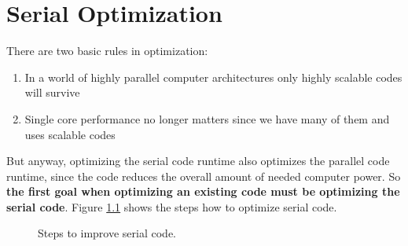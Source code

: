 \chapter{Serial Optimization}
    There are two basic rules in optimization:
    \begin{enumerate}
        \item   In a world of highly parallel computer architectures only
                highly scalable codes will survive
        \item   Single core performance no longer matters since we have
                many of them and uses scalable codes
    \end{enumerate}
    But anyway, optimizing the serial code runtime also optimizes the
    parallel code runtime, since the code reduces the overall 
    amount of needed computer power. So \textbf{ the first goal when
    optimizing an existing code must be optimizing the serial code}.
    Figure \ref{SerOpt:SerOptAlg} 
    shows the steps how to optimize serial code.
    
    \begin{figure}[h]
        \centering
        \caption{Steps to improve serial code.}
        \label{SerOpt:SerOptAlg}
    \end{figure}
    
